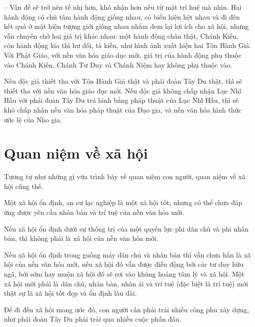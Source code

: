 -- Vấn đề sẽ trở nên tế nhị hơn, khó nhận hơn nếu từ mặt trí huệ mà nhìn. Hai hành động có chủ tâm hành động giống nhau, có biểu hiện hệt nhau và đi đến kết quả ở mặt hiện tượng giới giống nhau nhằm đem lại lợi ích cho xã hội, nhưng vẫn chuyên chở hai giá trị khác nhau: một hành động chân thật, Chánh Kiến, còn hành động kia thì hư dối, tà kiến, như hình ảnh xuất hiện hai Tôn Hành Giả. Với Phật Giáo, với nền văn hóa giáo dục mới, giá trị của hành động phụ thuộc vào Chánh Kiến, Chánh Tư Duy và Chánh Niệm hay không phụ thuộc vào.

Nếu độc giả thiết tha với Tôn Hành Giả thật và phái đoàn Tây Du thật, thì sẽ thiết tha với nền văn hóa giáo dục mới. Nếu độc giả không chấp nhận Lục Nhĩ Hầu với phái đoàn Tây Du trá hình bằng pháp thuật của Lục Nhĩ Hầu, thì sẽ khó chấp nhận nền văn hóa pháp thuật của Đạo gia, và nền văn hóa hình thức ước lệ của Nho gia.

\section{Quan niệm về xã hội} %
\label{sec:56_57_xa_hoi}

Tương tự như những gì vừa trình bày về quan niệm con người, quan niệm về xã hội cũng thế.

Một xã hội ổn định, an cư lạc nghiệp là một xã hội tốt, nhưng có thể chưa đáp ứng được yêu cầu nhân bản và trí tuệ của nền văn hóa mới.

Nếu xã hội ổn định dưới sự thống trị của một quyền lực phi dân chủ và phi nhân bản, thì không phải là xã hội của nền văn hóa mới.

Nếu xã hội ổn định trong guồng máy dân chủ và nhân bản thì vẫn chưa hẳn là xã hội của nền văn hóa mới, nếu xã hội đó vẫn được điều động bởi các tư duy hữu ngã, bởi sớm hay muộn xã hội đó sẽ rơi vào khủng hoảng tâm lý và xã hội. Một xã hội mới phải là dân chủ, nhân bản, nhân ái và trí tuệ (đặc biệt là trí tuệ) mới thật sự là xã hội tốt đẹp và ổn định lâu dài.

Để đi đến xã hội mong ước đó, con người cần phải trải nhiều công phu xây dựng, như phái đoàn Tây Du phải trải qua nhiều cuộc phấn đấu.
